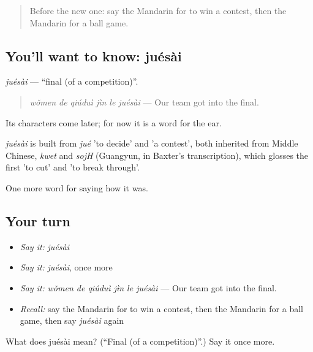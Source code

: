 \label{lesson:ZH-C500-juesai}



\begin{quote}
Before the new one: say the Mandarin for to win a contest, then the Mandarin for a ball game.
\end{quote}

\subsection*{You'll want to know: juésài}
\emph{juésài} — \textquotedblleft{}final (of a competition)\textquotedblright{}.

\begin{quote}
\emph{wǒmen de qiúduì jìn le juésài} — Our team got into the final.
\end{quote}

Its characters come later; for now it is a word for the ear.

\begin{cousinweb}
\emph{juésài} is built from \emph{jué} 'to decide' and  'a contest', both inherited from Middle Chinese, \emph{kwet} and \emph{sojH} (Guangyun, in Baxter's transcription), which glosses the first 'to cut' and 'to break through'.
\end{cousinweb}

\begin{grammarlens}[title={What you've built}]
One more word for saying how it was.
\end{grammarlens}

\subsection*{Your turn}
\begin{itemize}
\raggedright
  \item \emph{Say it:} \emph{juésài}
  \item \emph{Say it:} \emph{juésài}, once more
  \item \emph{Say it:} \emph{wǒmen de qiúduì jìn le juésài} — Our team got into the final.
  \item \emph{Recall:} say the Mandarin for to win a contest, then the Mandarin for a ball game, then say \emph{juésài} again
\end{itemize}

\begin{tcolorbox}[breakable,colback=teal!4,colframe=teal!35!black,title={Before you move on}]
What does juésài mean? (\textquotedblleft{}Final (of a competition)\textquotedblright{}.) Say it once more.
\end{tcolorbox}
